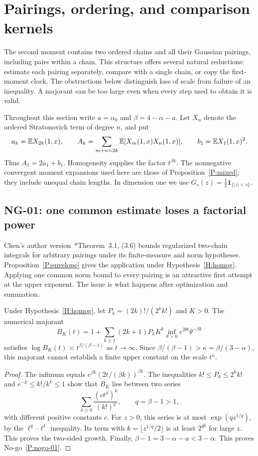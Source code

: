 \section{Pairings, ordering, and comparison kernels}\label{S:nogo-pairings}

The second moment contains two ordered chains and all their Gaussian
pairings, including pairs within a chain. This structure offers several
natural reductions: estimate each pairing separately, compare with a single
chain, or copy the first-moment clock. The obstructions below distinguish
loss of scale from failure of an inequality. A majorant can be too large even
when every step used to obtain it is valid.

Throughout this section write $a=\alpha_0$ and
$\beta=4-\alpha-a$. Let $X_n$ denote the ordered Stratonovich term of degree
$n$, and put
\[
  a_k=\mathbb{E} X_{2k}(1,x),\qquad
  A_k=\sum_{m+n=2k}\mathbb{E}[X_m(1,x)X_n(1,x)],\qquad
  b_1=\mathbb{E} X_1(1,x)^2.
\]
Thus $A_1=2a_1+b_1$. Homogeneity supplies the factor $t^{\beta k}$.
The nonnegative convergent moment expansions used here are those of
Proposition~\ref{P:mixed}; they include unequal chain lengths. In dimension
one we use $G_s(z)=\frac12\mathbf1_{\{|z|<s\}}$.

\subsection{NG-01: one common estimate loses a factorial power}
\label{S:nogo-01}

Chen's author version~\cite{chen:author2026:time-dependency}*{Theorem~3.1, (3.6)}
bounds regularized two-chain integrals for arbitrary pairings under its
finite-measure and norm hypotheses. Proposition~\ref{P:envelope} gives the
application under Hypothesis~\ref{H:homog}. Applying one common norm bound
to every pairing is an attractive first attempt at the upper exponent.
The issue is what happens after optimization and summation.

\setcounter{nogo}{0}
\begin{nogo}
  \label{P:nogo-01}
  Under Hypothesis~\ref{H:homog}, let $P_k=(2k)!/(2^k k!)$ and $K>0$.
  The numerical majorant
  \[
    B_K(t)=1+\sum_{k\ge1}(2k+1)P_kK^k
    \inf_{\theta>0}e^{2\theta t}\theta^{-\beta k}
  \]
  satisfies $\log B_K(t)\asymp t^{\beta/(\beta-1)}$ as $t\to\infty$.
  Since $\beta/(\beta-1)>\kappa=\beta/(3-\alpha)$, this majorant cannot
  establish a finite upper constant on the scale $t^\kappa$.
\end{nogo}
\begin{proof}
  The infimum equals $e^{\beta k}(2t/(\beta k))^{\beta k}$.
  The inequalities $k!\le P_k\le2^k k!$ and
  $e^{-k}\le k!/k^k\le1$ show that $B_K$ lies between two series
  \[
    \sum_{k\ge0}\frac{(c t^\beta)^k}{(k!)^q},\qquad q=\beta-1>1,
  \]
  with different positive constants $c$. For $z>0$, this series is at most
  $\exp(qz^{1/q})$, by the $\ell^q$--$\ell^1$ inequality. Its term with
  $k=\lfloor z^{1/q}/2\rfloor$ is at least $2^{qk}$ for large $z$.
  This proves the two-sided growth. Finally, $\beta-1=3-\alpha-a<3-\alpha$.
  This proves No-go~\ref{P:nogo-01}.
\end{proof}

